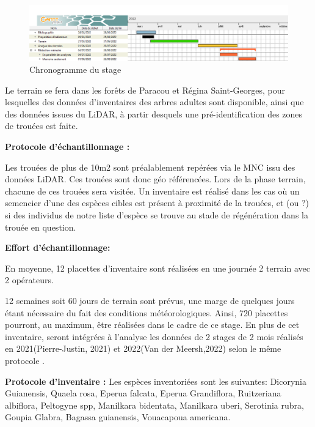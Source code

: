 \documentclass[
  12pt,
  american,
  a4paper,
  extrafontsizes,onecolumn,openright
  ]{memoir}
\begin{document}
\scriptsize

\begin{figure}

{\centering \includegraphics[width=1\linewidth]{images/chronogramme} 

}

\caption{Chronogramme du stage}\label{fig:planning}
\end{figure}

\normalsize

Le terrain se fera dans les forêts de Paracou et Régina Saint-Georges, pour lesquelles des données d'inventaires des arbres adultes sont disponible, ainsi que des données issues du LiDAR, à partir desquels une pré-identification des zones de trouées est faite.

\textbf{Protocole d'échantillonnage :}

Les trouées de plus de 10m2 sont préalablement repérées via le MNC issu des données LiDAR. Ces trouées sont donc géo référencées. Lors de la phase terrain, chacune de ces trouées sera visitée. Un inventaire est réalisé dans les cas où un semencier d'une des espèces cibles est présent à proximité de la trouées, et (ou ?) si des individus de notre liste d'espèce se trouve au stade de régénération dans la trouée en question.

\textbf{Effort d'échantillonnage:}

En moyenne, 12 placettes d'inventaire sont réalisées en une journée 2 terrain avec 2 opérateurs.

12 semaines soit 60 jours de terrain sont prévus, une marge de quelques jours étant nécessaire du fait des conditions météorologiques. Ainsi, 720 placettes pourront, au maximum, être réalisées dans le cadre de ce stage. En plus de cet inventaire, seront intégrées à l'analyse les données de 2 stages de 2 mois réalisés en 2021(Pierre-Justin, 2021) et 2022(Van der Meersh,2022) selon le même protocole .

\textbf{Protocole d'inventaire :}
Les espèces inventoriées sont les suivantes: Dicorynia Guianensis, Quaela rosa, Eperua falcata, Eperua Grandiflora, Ruitzeriana albiflora, Peltogyne spp, Manilkara bidentata, Manilkara uberi, Serotinia rubra, Goupia Glabra, Bagassa guianensis, Vouacapoua americana.
\end{document}
